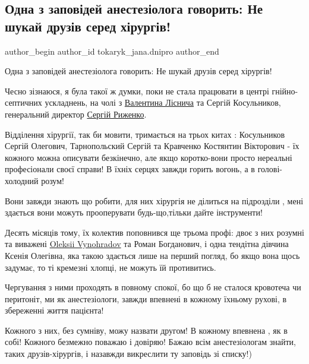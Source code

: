  
 
 
 
 

\subsection{Одна з заповідей анестезіолога говорить: Не шукай друзів серед хірургів!}
\label{sec:28_12_2022.fb.tokaryk_jana.dnipro.1.odna_z_zapov_dei_ane}

\ifcmt
 author_begin
   author_id tokaryk_jana.dnipro
 author_end
\fi

Одна з заповідей анестезіолога говорить: Не шукай друзів серед хірургів!

Чесно зізнаюся, я була такої ж думки, поки не стала працювати в центрі
гнійно-септичних ускладнень, на чолі з
\href{https://www.facebook.com/profile.php?id=100009329127079}{Валентина
Ліснича} та Сергій Косульников, генеральний директор
\href{https://www.facebook.com/rsa010963}{Сергій Риженко}.

Відділення хірургії, так би мовити, тримається на трьох китах : Косульников
Сергій Олегович, Тарнопольский Сергій та Кравченко Костянтин Вікторович - їх
кожного можна описувати безкінечно, але якщо коротко-вони просто нереальні
професіонали своєї справи! В їхніх серцях завжди горить вогонь, а в голові-
холодний розум!

Вони завжди знають що робити, для них хірургія не ділиться на підрозділи , мені
здається вони можуть прооперувати  будь-що,тільки дайте інструменти!

Десять місяців тому, їх колектив поповнився ще трьома профі: двоє з них розумні
та виважені  \href{https://www.facebook.com/oleksii.vynohradov}{Oleksii
Vynohradov} та Роман Богданович, і одна тендітна дівчина Ксенія Олегівна, яка
такою здається лише на перший погляд, бо якщо вона щось задумає, то ті кремезні
хлопці, не можуть їй противитись.

Чергування з ними проходять в повному спокої, бо що б не сталося кровотеча чи
перитоніт, ми як анестезіологи, завжди впевнені в кожному їхньому рухові, в
збереженні життя пацієнта! 

Кожного з них, без сумніву, можу назвати другом! В кожному впевнена , як в
собі! Кожного безмежно поважаю і довіряю! Бажаю всім анестезіологам знайти,
таких друзів-хірургів, і назавжди викреслити  ту заповідь зі списку!)
